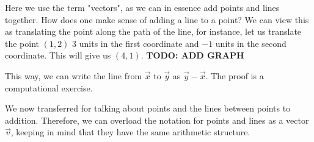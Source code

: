 \begin{remark}
	Here we use the term "vectors", as we can in essence add points and lines together. How does one make sense of adding a line to a point? We can view this as translating the point along the path of the line, for instance, let us translate the point $(1,2)$ $3$ units in the first coordinate and $-1$ units in the second coordinate. This will give us $(4,1)$.
 	\textbf{TODO: ADD GRAPH}
\end{remark}
This way, we can write the line from $\vec{x}$ to $\vec{y}$ as $\vec{y}-\vec{x}$. The proof is a computational exercise. \\ 
\begin{notation}
	We now transferred for talking about points and the lines between points to addition. Therefore, we can overload the notation for points and lines as a vector $\vec{v}$, keeping in mind that they have the same arithmetic structure.
\end{notation}


